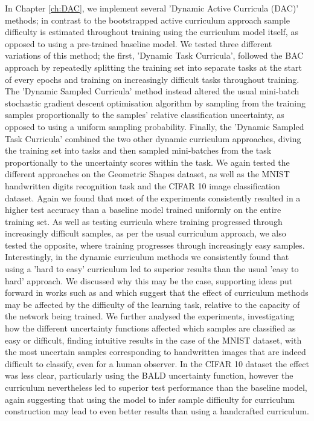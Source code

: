 In Chapter \ref{ch:DAC}, we implement several 'Dynamic Active Curricula (DAC)' methods; in contrast to the bootstrapped active curriculum approach sample difficulty is estimated throughout training using the curriculum model itself, as opposed to using a pre-trained baseline model. We tested three different variations of this method; the first, 'Dynamic Task Curricula', followed the BAC approach by repeatedly splitting the training set into separate tasks at the start of every epochs and training on increasingly difficult tasks throughout training. The 'Dynamic Sampled Curricula' method instead altered the usual mini-batch stochastic gradient descent optimisation algorithm by sampling from the training samples proportionally to the samples' relative classification uncertainty, as opposed to using a uniform sampling probability. Finally, the 'Dynamic Sampled Task Curricula' combined the two other dynamic curriculum approaches, diving the training set into tasks and then sampled mini-batches from the task proportionally to the uncertainty scores within the task. We again tested the different approaches on the Geometric Shapes dataset, as well as the MNIST handwritten digits recognition task and the CIFAR 10 image classification dataset. Again we found that most of the experiments consistently resulted in a higher test accuracy than a baseline model trained uniformly on the entire training set. As well as testing curricula where training progressed through increasingly difficult samples, as per the usual curriculum approach, we also tested the opposite, where training progresses through increasingly easy samples. Interestingly, in the dynamic curriculum methods we consistently found that using a 'hard to easy' curriculum led to superior results than the usual 'easy to hard' approach. We discussed why this may be the case, supporting ideas put forward in works such as \cite{Chang18} and \cite{weinshall2018curriculum} which suggest that the effect of curriculum methods may be affected by the difficulty of the learning task, relative to the capacity of the network being trained. We further analysed the experiments, investigating how the different uncertainty functions affected which samples are classified as easy or difficult, finding intuitive results in the case of the MNIST dataset, with the most uncertain samples corresponding to handwritten images that are indeed difficult to classify, even for a human observer. In the CIFAR 10 dataset the effect was less clear, particularly using the BALD \cite{houlsby2011bayesian} uncertainty function, however the curriculum nevertheless led to superior test performance than the baseline model, again suggesting that using the model to infer sample difficulty for curriculum construction may lead to even better results than using a handcrafted curriculum. 

